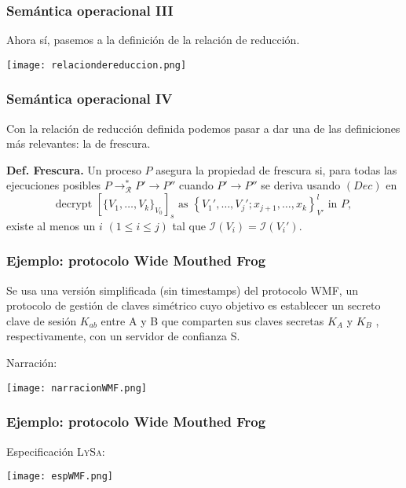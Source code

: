 \documentclass{beamer}
\begin{document}
\begin{frame}
    \frametitle{Semántica operacional III}
    \pause
    Ahora sí, pasemos a la definición de la relación de reducción.
    \pause[2]
    \begin{center}
        \texttt{[image: relaciondereduccion.png]}
    \end{center}
\end{frame}

\begin{frame}
    \frametitle{Semántica operacional IV}
    \pause
    Con la relación de reducción definida podemos pasar a dar una de las definiciones más relevantes: la de frescura.
    \pause[2]
    \vspace{0.7cm}
    
    \textbf{Def. Frescura.} Un proceso $P$ asegura la propiedad de frescura si, para todas las ejecuciones posibles $P \rightarrow^*_{\mathcal{R}} P' \rightarrow P''$ cuando $P' \rightarrow P''$ se deriva usando $(Dec)$ en
\[
\text{{decrypt }} [\{ V_1, \ldots, V_k\}_{V_0} ]_s \text{{ as }} \left\{ V_1', \ldots, V_j'; x_{j+1}, \ldots, x_k \right\}^l_{V'} \text{{ in }} P,
\]
existe al menos un $i$ $(1 \leq i \leq j)$ tal que $\mathcal{I}(V_i) = \mathcal{I}(V_i')$.

\end{frame}

\begin{frame}
    \frametitle{Ejemplo: protocolo Wide Mouthed Frog}
    \pause
    Se usa una versión simplificada (sin timestamps) del protocolo WMF, un protocolo de gestión de claves simétrico cuyo objetivo es establecer un secreto
    clave de sesión $K_{ab}$ entre A y B que comparten sus claves secretas
    $K_A$ y $K_B$ , respectivamente, con un servidor de confianza S.
    \pause[2]
    
    \vspace{0.7cm}
    Narración:
    \begin{center}
        \texttt{[image: narracionWMF.png]}
    \end{center}
\end{frame}

\begin{frame}
    \frametitle{Ejemplo: protocolo Wide Mouthed Frog}
    \pause
    Especificación L\textsc{y}S\textsc{a}:
    \pause[2]
    \begin{center}
        \texttt{[image: espWMF.png]}
    \end{center}
\end{frame}
\end{document}
